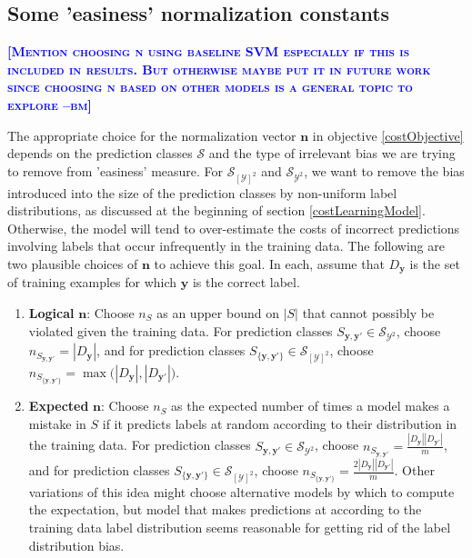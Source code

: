 \documentclass{article} %
\newcommand{\bmcomment}[1]{\textcolor{blue}{\textsc{\textbf{[#1 --bm]}}}}
\begin{document}
\subsection{Some 'easiness' normalization constants}

\bmcomment{Mention choosing n using baseline 
SVM especially if this is included in results.  But otherwise
maybe put it in future work since choosing n based on other
models is a general topic to explore}

The appropriate choice for the normalization vector $\mathbf{n}$ in 
objective \ref{costObjective} depends on the prediction classes
$\mathcal{S}$ and the type of irrelevant bias we are trying to
remove from 'easiness' measure. For $\mathcal{S}_{[\mathcal{Y}]^2}$
and $\mathcal{S}_{\mathcal{Y}^2}$, we want to remove the bias introduced
into the size of the prediction classes by non-uniform label 
distributions, as discussed at the beginning of section
\ref{costLearningModel}.  Otherwise, the model will tend to over-estimate
the costs of incorrect predictions involving labels that occur 
infrequently in the training data.  The following are two 
plausible choices of $\mathbf{n}$ to achieve this goal. In each,
assume that $D_\mathbf{y}$ is the set of training examples
for which $\mathbf{y}$ is the correct label.

\begin{enumerate}

\item \textbf{Logical} $\mathbf{n}$: Choose $n_S$ as an upper bound
on $|S|$ that cannot possibly be violated given the training data. 
For prediction classes 
$S_{\mathbf{y},\mathbf{y'}}\in\mathcal{S}_{\mathcal{Y}^2}$, 
choose $n_{S_{\mathbf{y},\mathbf{y'}}}=|D_\mathbf{y}|$, and for prediction 
classes 
$S_{\{\mathbf{y},\mathbf{y'}\}}\in\mathcal{S}_{[\mathcal{Y}]^2}$,
choose 
$n_{S_{\{\mathbf{y},\mathbf{y'}\}}}=
\max\big(|D_\mathbf{y}|,|D_\mathbf{y'}|\big)$.

\item \textbf{Expected} $\mathbf{n}$:  Choose $n_S$ as the expected
number of times a model makes a mistake in $S$ if it predicts labels
at random according to their distribution in the training data. 
For prediction classes 
$S_{\mathbf{y},\mathbf{y'}}\in\mathcal{S}_{\mathcal{Y}^2}$, 
choose $n_{S_{\mathbf{y},\mathbf{y'}}}=
\frac{|D_\mathbf{y}||D_\mathbf{y'}|}{m}$, 
and for prediction classes 
$S_{\{\mathbf{y},\mathbf{y'}\}}\in\mathcal{S}_{[\mathcal{Y}]^2}$,
choose 
$n_{S_{\{\mathbf{y},\mathbf{y'}\}}}=
\frac{2|D_\mathbf{y}||D_\mathbf{y'}|}{m}$.
Other variations of this idea might choose alternative models by which
to compute the expectation, but model that makes predictions at
according to the training data label distribution seems 
reasonable for getting rid of the label distribution bias.

\end{enumerate}
\end{document}
